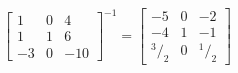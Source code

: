 \documentclass[preview]{standalone}
\begin{document}
\[ 
 \begin{bmatrix}1 & 0 & 4\\ 1 & 1 & 6\\ -3 & 0 & -10\end{bmatrix}^{-1} 
 = \begin{bmatrix}-5 & 0 & -2\\ -4 & 1 & -1\\ ^3/_2 & 0 & ^1/_2\end{bmatrix} 
 \] 
\end{document}
